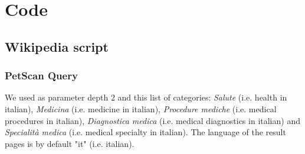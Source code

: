 \appendix
\chapter{Code}

\section{Wikipedia script}

\subsection{PetScan Query}
\label{appendix:petscanQuery}
We used as parameter depth 2 and this list of categories: \textit{Salute} (i.e. health in italian), \textit{Medicina} (i.e. medicine in italian),  \textit{Procedure mediche} (i.e. medical procedures in italian),  \textit{Diagnostica medica} (i.e. medical diagnostics in italian) and \textit{Specialità medica} (i.e. medical specialty in italian). The language of the result pages is by default "it" (i.e. italian).

